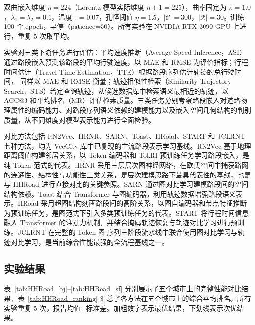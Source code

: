 双曲嵌入维度 $n=224$（Lorentz 模型实际维度 $n+1=225$），曲率固定为 $\kappa=1.0$，$\lambda_1=\lambda_2=0.1$，温度 $\tau=0.07$，孔径阈值 $\eta=1.5$，$|\mathcal{C}|=300$，$|\mathcal{R}|=30$。训练 100 个 epoch，早停（patience=50）。所有实验在 NVIDIA RTX 3090 GPU 上进行，重复 5 次取平均。

实验对三类下游任务进行评估：平均速度推断（Average Speed Inference，ASI）通过路段嵌入预测该路段的平均行驶速度，以 MAE 和 RMSE 为评价指标；行程时间估计（Travel Time Estimation，TTE）根据路段序列估计轨迹的总行驶时间，
同样以 MAE 和 RMSE 衡量；轨迹相似性检索（Similarity Trajectory Search，STS）给定查询轨迹，从候选数据库中检索语义最相近的轨迹，以 ACC@3 和平均排名（MR）评估检索质量。三类任务分别考察路段嵌入对道路物理属性的编码能力、对路段序列语义依赖的建模能力以及嵌入空间几何结构的判别质量，从不同维度对模型表示能力进行全面检验。

对比方法包括 RN2Vec\cite{wang2019rn2vec}、HRNR\cite{wu2020hrnr}、SARN\cite{chang2023sarn}、Toast\cite{chen2021toast}、HRoad\cite{zhang2023road}、START\cite{chen2022start} 和 JCLRNT\cite{mao2022jclrnt} 七种方法，均为 VecCity 库中已复现的主流路段表示学习基线。RN2Vec 基于地理距离阈值构建邻居关系，以 Token 编码器和 TokRI 预训练任务学习路段嵌入，是纯 Token 范式的代表。HRNR 采用三层层次图神经网络，在欧氏空间中捕获路网的连通性、结构性与功能性三类关系，是层次建模思路下最具代表性的基线，也是与 HHRoad 进行直接对比的关键参照。SARN 通过图对比学习建模路段间的空间结构依赖。Toast 结合 Transformer 与图编码器，利用轨迹数据增强路段语义表示。HRoad 采用超图结构刻画路段间的高阶关系，以图自编码器和节点特征推断为预训练任务，是图范式下引入多类预训练任务的代表。START 将行程时间信息融入 Transformer 的注意力机制，并结合掩码轨迹恢复与轨迹对比学习进行预训练。JCLRNT 在完整的 Token-图-序列三阶段流水线中联合使用图对比学习与轨迹对比学习，是当前综合性能最强的全流程基线之一。

\subsection{实验结果}

表~\ref{tab:HHRoad_bj}--\ref{tab:HHRoad_sf} 分别展示了五个城市上的完整性能对比结果，表~\ref{tab:HHRoad_ranking} 汇总了各方法在五个城市上的综合平均排名。所有实验重复 5 次，报告均值$\pm$标准差。加粗数字表示最优结果，下划线表示次优结果。


